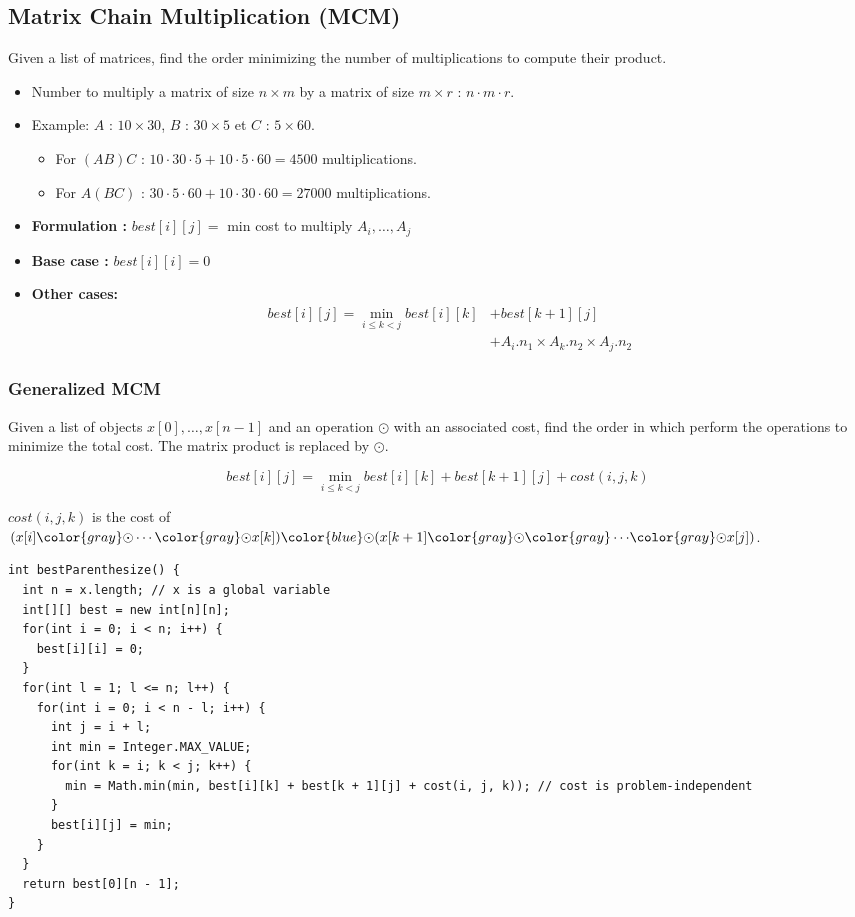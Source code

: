 \subsection{Matrix Chain Multiplication (MCM)}
Given a list of matrices, find the order minimizing the number of multiplications to compute their product.
\begin{itemize}
 \item Number to multiply a matrix of size $n \times m$ by a matrix of size $m \times r$ : $n \cdot m \cdot r$.

 \item Example: $A$ : $10 \times 30$, $B$ : $30 \times 5$ et $C$ : $5 \times 60$.
 \begin{itemize}
 \item For $(AB)C$ : $10 \cdot 30 \cdot 5 + 10 \cdot 5 \cdot 60 = 4500$ multiplications.
 \item For $A(BC)$ : $30 \cdot 5 \cdot 60 + 10 \cdot 30 \cdot 60 = 27000$ multiplications.
  \end{itemize}
\end{itemize}

\begin{itemize}
 \item \textbf{Formulation :}
 $best[i][j] =$ min cost to multiply $A_i, \ldots, A_j$
 \item \textbf{Base case :} $best[i][i] = 0 $
 \item \textbf{Other cases:}
 \begin{align*}
 best[i][j] = \min_{i \leq k < j} best[i][k] & + best[k + 1][j] \\
                                             & + A_i.n_1 \times A_k.n_2 \times A_j.n_2
 \end{align*}
\end{itemize}

\subsubsection{Generalized MCM}
Given a list of objects $x[0], \ldots, x[n - 1]$ and an operation $\odot$ with an associated cost, find the order in which perform the operations to minimize the total cost. The matrix product is replaced by $\odot$.

$$ best[i][j] = \min_{i \leq k < j} best[i][k] + best[k + 1][j] + cost(i, j, k)$$

$cost(i, j, k)$ is the cost of $(x[i] {\color{gray} \odot} \cdots {\color{gray} \odot} x[k]) {\color{blue} \mathbf{\odot}} (x[k + 1] {\color{gray} \odot} {\color{gray} \cdots} {\color{gray} \odot} x[j])$.
\newline
\begin{lstlisting}
int bestParenthesize() {
  int n = x.length; // x is a global variable
  int[][] best = new int[n][n];
  for(int i = 0; i < n; i++) { 
    best[i][i] = 0;
  }
  for(int l = 1; l <= n; l++) {
    for(int i = 0; i < n - l; i++) {
      int j = i + l;
      int min = Integer.MAX_VALUE;
      for(int k = i; k < j; k++) {
        min = Math.min(min, best[i][k] + best[k + 1][j] + cost(i, j, k)); // cost is problem-independent
      }
      best[i][j] = min;
    }
  }
  return best[0][n - 1];
} 
\end{lstlisting}